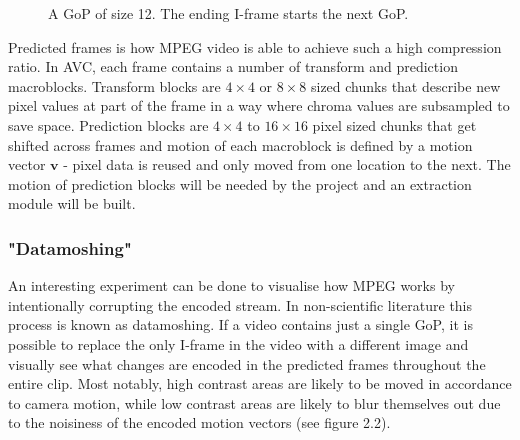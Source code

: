 \documentclass[11pt,english]{report}
\newcommand*{\angleframe}[7]{%
\begin{scope}[xshift  =#4, yshift = #5,
			every node/.append style = {yslant = #7},
			yslant = #7,
			local bounding box = #2]
\node[#1] at (#6,#6) {};
\node[label, yslant = -#7, above right=9em and -0.75em of #2.south east](#2-label) {#3};
\end{scope}
}
\begin{document}
\begin{figure}[!ht]
	\centering
	\caption{\centering A GoP of size 12. The ending I-frame starts the next GoP.}
\end{figure}

Predicted frames is how MPEG video is able to achieve such a high compression ratio. In AVC, each frame contains a number of transform and prediction macroblocks. Transform blocks are $4 \times 4$ or $8 \times 8$ sized chunks that describe new pixel values at part of the frame in a way where chroma values are subsampled to save space. Prediction blocks are $4 \times 4$ to $16 \times 16$ pixel sized chunks that get shifted across frames and motion of each macroblock is defined by a motion vector $\mathbf{v}$ - pixel data is reused and only moved from one location to the next. The motion of prediction blocks will be needed by the project and an extraction module will be built.

\subsubsection{"Datamoshing"}

An interesting experiment can be done to visualise how MPEG works by intentionally corrupting the encoded stream. In non-scientific literature this process is known as datamoshing. If a video contains just a single GoP, it is possible to replace the only I-frame in the video with a different image and visually see what changes are encoded in the predicted frames throughout the entire clip. Most notably, high contrast areas are likely to be moved in accordance to camera motion, while low contrast areas are likely to blur themselves out due to the noisiness of the encoded motion vectors (see figure 2.2).
\end{document}
